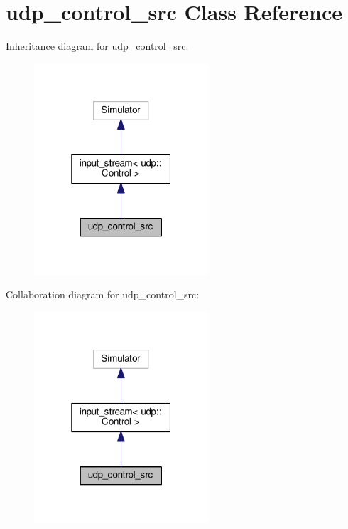 \hypertarget{classudp__control__src}{}\section{udp\+\_\+control\+\_\+src Class Reference}
\label{classudp__control__src}


Inheritance diagram for udp\+\_\+control\+\_\+src\+:
\nopagebreak
\begin{figure}[H]
\begin{center}
\leavevmode
\includegraphics[width=184pt]{classudp__control__src__inherit__graph}
\end{center}
\end{figure}


Collaboration diagram for udp\+\_\+control\+\_\+src\+:
\nopagebreak
\begin{figure}[H]
\begin{center}
\leavevmode
\includegraphics[width=184pt]{classudp__control__src__coll__graph}
\end{center}
\end{figure}
